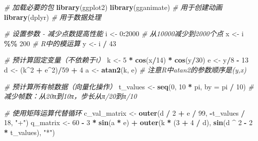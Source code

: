 \documentclass[
]{book}
\newenvironment{Shaded}{\begin{snugshade}}{\end{snugshade}}
\newcommand{\AttributeTok}[1]{\textcolor[rgb]{0.13,0.29,0.53}{#1}}
\newcommand{\CommentTok}[1]{\textcolor[rgb]{0.56,0.35,0.01}{\textit{#1}}}
\newcommand{\DecValTok}[1]{\textcolor[rgb]{0.00,0.00,0.81}{#1}}
\newcommand{\FunctionTok}[1]{\textcolor[rgb]{0.13,0.29,0.53}{\textbf{#1}}}
\newcommand{\NormalTok}[1]{#1}
\newcommand{\OtherTok}[1]{\textcolor[rgb]{0.56,0.35,0.01}{#1}}
\newcommand{\SpecialCharTok}[1]{\textcolor[rgb]{0.81,0.36,0.00}{\textbf{#1}}}
\newcommand{\StringTok}[1]{\textcolor[rgb]{0.31,0.60,0.02}{#1}}
\begin{document}
\begin{Shaded}
\begin{Highlighting}[]
\CommentTok{\# 加载必要的包}
\FunctionTok{library}\NormalTok{(ggplot2)}
\FunctionTok{library}\NormalTok{(gganimate) }\CommentTok{\# 用于创建动画}
\FunctionTok{library}\NormalTok{(dplyr)     }\CommentTok{\# 用于数据处理}

\CommentTok{\# 设置参数 {-} 减少点数提高性能}
\NormalTok{i }\OtherTok{\textless{}{-}} \DecValTok{0}\SpecialCharTok{:}\DecValTok{2000}  \CommentTok{\# 从10000减少到2000个点}
\NormalTok{x }\OtherTok{\textless{}{-}}\NormalTok{ i }\SpecialCharTok{\%\%} \DecValTok{200}      \CommentTok{\# R中的模运算}
\NormalTok{y }\OtherTok{\textless{}{-}}\NormalTok{ i }\SpecialCharTok{/} \DecValTok{43}

\CommentTok{\# 预计算固定变量（不依赖于t）}
\NormalTok{k }\OtherTok{\textless{}{-}} \DecValTok{5} \SpecialCharTok{*} \FunctionTok{cos}\NormalTok{(x}\SpecialCharTok{/}\DecValTok{14}\NormalTok{) }\SpecialCharTok{*} \FunctionTok{cos}\NormalTok{(y}\SpecialCharTok{/}\DecValTok{30}\NormalTok{)}
\NormalTok{e }\OtherTok{\textless{}{-}}\NormalTok{ y}\SpecialCharTok{/}\DecValTok{8} \SpecialCharTok{{-}} \DecValTok{13}
\NormalTok{d }\OtherTok{\textless{}{-}}\NormalTok{ (k}\SpecialCharTok{\^{}}\DecValTok{2} \SpecialCharTok{+}\NormalTok{ e}\SpecialCharTok{\^{}}\DecValTok{2}\NormalTok{)}\SpecialCharTok{/}\DecValTok{59} \SpecialCharTok{+} \DecValTok{4}
\NormalTok{a }\OtherTok{\textless{}{-}} \FunctionTok{atan2}\NormalTok{(k, e)   }\CommentTok{\# 注意R中atan2的参数顺序是(y,x)}

\CommentTok{\# 预计算所有帧数据（向量化操作）}
\NormalTok{t\_values }\OtherTok{\textless{}{-}} \FunctionTok{seq}\NormalTok{(}\DecValTok{0}\NormalTok{, }\DecValTok{10} \SpecialCharTok{*}\NormalTok{ pi, }\AttributeTok{by =}\NormalTok{ pi }\SpecialCharTok{/} \DecValTok{10}\NormalTok{)  }\CommentTok{\# 减少帧数：从20π到10π，步长从π/20到π/10}

\CommentTok{\# 使用矩阵运算代替循环}
\NormalTok{c\_val\_matrix }\OtherTok{\textless{}{-}} \FunctionTok{outer}\NormalTok{(d }\SpecialCharTok{/} \DecValTok{2} \SpecialCharTok{+}\NormalTok{ e }\SpecialCharTok{/} \DecValTok{99}\NormalTok{, }\SpecialCharTok{{-}}\NormalTok{t\_values }\SpecialCharTok{/} \DecValTok{18}\NormalTok{, }\StringTok{"+"}\NormalTok{)}
\NormalTok{q\_matrix }\OtherTok{\textless{}{-}} \DecValTok{60} \SpecialCharTok{{-}} \DecValTok{3} \SpecialCharTok{*} \FunctionTok{sin}\NormalTok{(a }\SpecialCharTok{*}\NormalTok{ e) }\SpecialCharTok{+} \FunctionTok{outer}\NormalTok{(k }\SpecialCharTok{*}\NormalTok{ (}\DecValTok{3} \SpecialCharTok{+} \DecValTok{4} \SpecialCharTok{/}\NormalTok{ d), }\FunctionTok{sin}\NormalTok{(d }\SpecialCharTok{\^{}} \DecValTok{2} \SpecialCharTok{{-}} \DecValTok{2} \SpecialCharTok{*}\NormalTok{ t\_values), }\StringTok{"*"}\NormalTok{)}


\end{Highlighting}
\end{Shaded}
\end{document}
